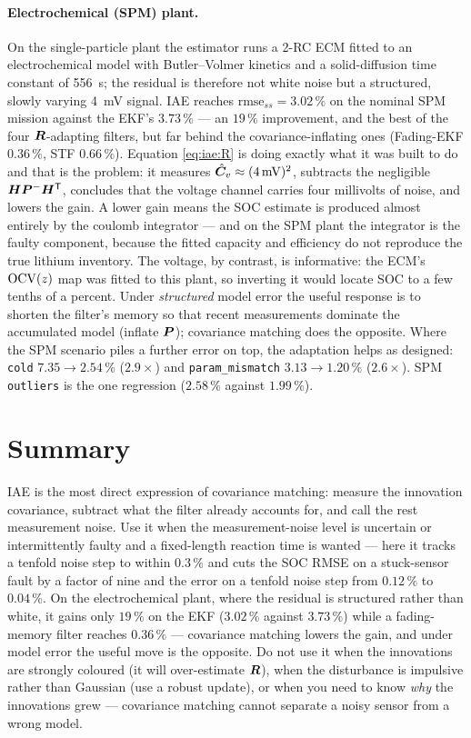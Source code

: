 \paragraph{Electrochemical (SPM) plant.}  On the single-particle plant the estimator runs a 2-RC ECM
fitted to an electrochemical model with Butler--Volmer kinetics and a solid-diffusion time constant
of \SI{556}{\second}; the residual is therefore not white noise but a structured, slowly varying
\SI{4}{\milli\volt} signal.  IAE reaches $\mathrm{rmse}_{ss}=3.02\,\%$ on the nominal SPM mission
against the EKF's $3.73\,\%$ --- an $19\,\%$ improvement, and the best of the four $\bm{R}$-adapting
filters, but far behind the covariance-inflating ones (Fading-EKF $0.36\,\%$, STF $0.66\,\%$).
Equation \eqref{eq:iae:R} is doing exactly what it was built to do and that is the problem: it
measures $\hat{\bm{C}}_v\approx(\SI{4}{\milli\volt})^2$, subtracts the negligible
$\bm{H}\bm{P}^{-}\bm{H}^{\mathsf{T}}$, concludes that the voltage channel carries four millivolts of noise, and lowers
the gain.  A lower gain means the SOC estimate is produced almost entirely by the coulomb integrator
--- and on the SPM plant the integrator is the faulty component, because the fitted capacity and
efficiency do not reproduce the true lithium inventory.  The voltage, by contrast, is informative:
the ECM's $\mathrm{OCV}(z)$ map was fitted to this plant, so inverting it would locate SOC to a few tenths
of a percent.  Under \emph{structured} model error the useful response is to shorten the filter's
memory so that recent measurements dominate the accumulated model (inflate $\bm{P}$); covariance
matching does the opposite.  Where the SPM scenario piles a further error on top, the adaptation
helps as designed: \texttt{cold} $7.35\to2.54\,\%$ ($2.9\times$) and \texttt{param\_mismatch}
$3.13\to1.20\,\%$ ($2.6\times$).  SPM \texttt{outliers} is the one regression ($2.58\,\%$ against
$1.99\,\%$).

\section{Summary}
IAE is the most direct expression of covariance matching: measure the innovation covariance, subtract
what the filter already accounts for, and call the rest measurement noise.  Use it when the
measurement-noise level is uncertain or intermittently faulty and a fixed-length reaction time is
wanted --- here it tracks a tenfold noise step to within $0.3\,\%$ and cuts the SOC RMSE on a
stuck-sensor fault by a factor of nine and the error on a tenfold noise step from $0.12\,\%$ to
$0.04\,\%$.  On the electrochemical plant, where the residual is structured rather than white, it
gains only $19\,\%$ on the EKF ($3.02\,\%$ against $3.73\,\%$) while a fading-memory filter reaches
$0.36\,\%$ --- covariance matching lowers the gain, and under model error the useful move is the
opposite.  Do not use it when the innovations are strongly coloured
(it will over-estimate $\bm{R}$), when the disturbance is impulsive rather than Gaussian (use a robust
update), or when you need to know \emph{why} the innovations grew --- covariance matching cannot
separate a noisy sensor from a wrong model.
